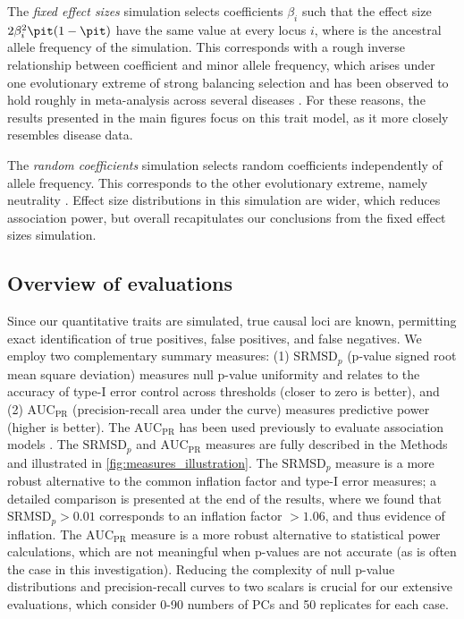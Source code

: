 \documentclass[11pt]{article}
\newcommand{\rmsd}{\text{SRMSD}_p}
\newcommand{\auc}{\text{AUC}_\text{PR}}
\begin{document}
The \textit{fixed effect sizes} simulation selects coefficients $\beta_i$ such that the effect size $2 \beta_i^2 \pit ( 1 - \pit )$ have the same value at every locus $i$, where \pit is the ancestral allele frequency of the simulation.
This corresponds with a rough inverse relationship between coefficient and minor allele frequency, which arises under one evolutionary extreme of strong balancing selection \citep{simons_population_2018} and has been observed to hold roughly in meta-analysis across several diseases \citep{park_distribution_2011}.
For these reasons, the results presented in the main figures focus on this trait model, as it more closely resembles disease data.

The \textit{random coefficients} simulation selects random coefficients independently of allele frequency.
This corresponds to the other evolutionary extreme, namely neutrality \citep{simons_population_2018}.
Effect size distributions in this simulation are wider, which reduces association power, but overall recapitulates our conclusions from the fixed effect sizes simulation.

\subsection{Overview of evaluations}

Since our quantitative traits are simulated, true causal loci are known, permitting exact identification of true positives, false positives, and false negatives.
We employ two complementary summary measures:
(1) $\rmsd$ (p-value signed root mean square deviation) measures null p-value uniformity and relates to the accuracy of type-I error control across thresholds (closer to zero is better), and
(2) $\auc$ (precision-recall area under the curve) measures predictive power (higher is better).
The $\auc$ has been used previously to evaluate association models \citep{rakitsch_lasso_2013}.
The $\rmsd$ and $\auc$ measures are fully described in the Methods and illustrated in \cref{fig:measures_illustration}.
The $\rmsd$ measure is a more robust alternative to the common inflation factor and type-I error measures; a detailed comparison is presented at the end of the results, where we found that $\rmsd > 0.01$ corresponds to an inflation factor $> 1.06$, and thus evidence of inflation.
The $\auc$ measure is a more robust alternative to statistical power calculations, which are not meaningful when p-values are not accurate (as is often the case in this investigation).
Reducing the complexity of null p-value distributions and precision-recall curves to two scalars is crucial for our extensive evaluations, which consider 0-90 numbers of PCs and 50 replicates for each case.
\end{document}
